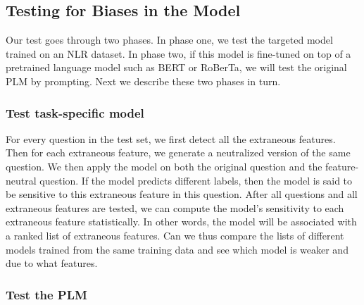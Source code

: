 
\subsection{Testing for Biases in the Model}
Our test goes through two phases. In phase one, we test the targeted model trained on an NLR dataset. 
In phase two, if this model is fine-tuned on top of a pretrained language model such as
BERT or RoBerTa, we will test the original PLM by prompting. Next we describe these two phases
in turn.

\subsubsection{Test task-specific model}
For every question in the test set, we first detect all the extraneous features. Then for each
extraneous feature, we generate a neutralized version of the same question. We then apply the model
on both the original question and the feature-neutral question. If the model predicts different labels,
then the model is said to be sensitive to this extraneous feature in this question.
After all questions and all extraneous features are tested, we can compute the model's sensitivity
to each extraneous feature statistically. In other words, the model will be associated with a ranked
list of extraneous features. Can we thus compare the lists of different models trained from the
same training data and see which model is weaker and due to what features.
 
\subsubsection{Test the PLM}


